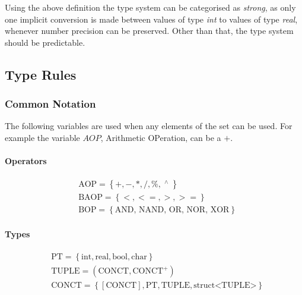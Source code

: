 Using the above definition the type system can be categorised as \emph{strong}, as only one implicit conversion is made between values of type \emph{int} to values of type \emph{real}, whenever number precision can be preserved. Other than that, the type system should be predictable.



\subsection{Type Rules}

\newcommand{\Tpot}{^\wedge{}}
\newcommand{\Tint}{\text{int}}
\newcommand{\Treal}{\text{real}}
\newcommand{\Tbool}{\text{bool}}
\newcommand{\Tchar}{\text{char}}
\newcommand{\Tvoid}{\text{void}}
\newcommand{\Taop}{\text{AOP}}
\newcommand{\Tbaop}{\text{BAOP}}
\newcommand{\Tbop}{\text{BOP}}
\newcommand{\Tconct}{\text{CONCT}}
\newcommand{\Tpt}{\text{PT}}
\newcommand{\Tenv}{E \vdash}

\subsubsection{Common Notation}
The following variables are used when any elements of the set can be used. For example the variable $AOP$, Arithmetic OPeration, can be a $+$.
\paragraph{Operators}
\begin{align*}
&\Taop = \left\{ {+, -, *, /, \%, \; \Tpot \;} \right\}
\\
&\Tbaop = \left\{ {<, <=, >, >=} \right\}
\\
&\Tbop = \left\{ {\text{AND, NAND, OR, NOR, XOR}} \right\}
\end{align*}

\paragraph{Types}
\begin{align*}
&\Tpt = \left\{ {\Tint, \Treal, \Tbool, \Tchar} \right\}
\\
&\text{TUPLE} = (\Tconct, \Tconct^+)
\\            
&\Tconct = \left\{ { \left[ \Tconct \right], \Tpt, \text{TUPLE}, \text{struct<TUPLE>}} \right\}
\end{align*}

